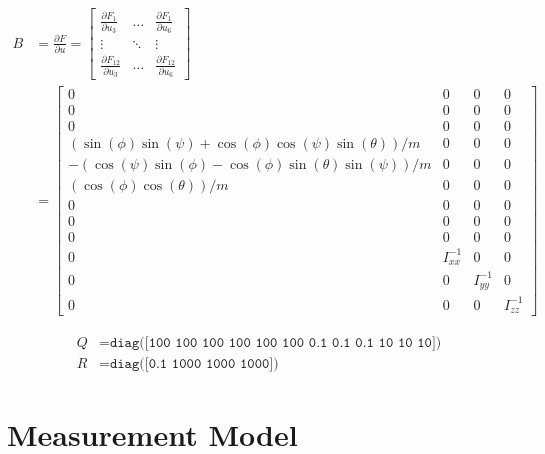 \documentclass[letterpaper, paper,11pt]{AAS}	%
\begin{document}
\begin{equation}
\begin{split}
\label{eq:B}
B &= \frac{\partial F}{\partial u} = 
\begin{bmatrix} 
    \frac{\partial F_1}{\partial u_3} & \dots  & \frac{\partial F_1}{\partial u_6}\\
    \vdots & \ddots & \vdots\\
    \frac{\partial F_{12}}{\partial u_3} & \dots  & \frac{\partial F_{12}}{\partial u_6} 
\end{bmatrix}\\&=\begin{bmatrix}
         0&0&0&0\\
         0&0&0&0\\
         0&0&0&0\\
         (\sin(\phi)\sin(\psi) + \cos(\phi)\cos(\psi)\sin(\theta)) / m&0&0&0\\
         -(\cos(\psi)\sin(\phi) - \cos(\phi)\sin(\theta)\sin(\psi)) / m&0&0&0\\
         (\cos(\phi)\cos(\theta)) / m&0&0&0\\
         0&0&0&0\\
         0&0&0&0\\
         0&0&0&0\\
         0&I_{xx}^{-1}&0&0\\
         0&0&I_{yy}^{-1}&0\\
         0&0&0&I_{zz}^{-1}
\end{bmatrix}
\end{split}
\end{equation}

\begin{equation}
\label{eq:QandR}
\begin{split}
Q &= \texttt{diag([100 100 100 100 100 100 0.1 0.1 0.1 10 10 10])}\\
R &= \texttt{diag([0.1 1000 1000 1000])}
\end{split}
\end{equation}

\section{Measurement Model}
\end{document}
